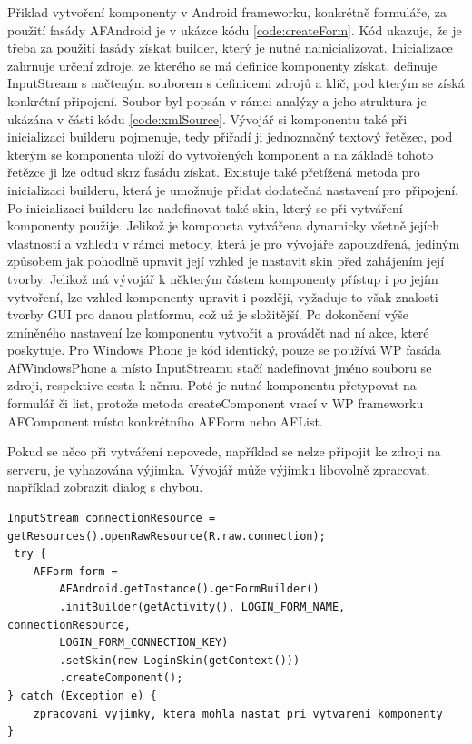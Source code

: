 Přiklad vytvoření komponenty v Android frameworku, konkrétně formuláře, za použití fasády AFAndroid je v ukázce kódu \ref{code:createForm}. Kód ukazuje, že je třeba za použití fasády získat builder, který je nutné nainicializovat. Inicializace zahrnuje určení zdroje, ze kterého se má definice komponenty získat, definuje InputStream s načteným souborem s definicemi zdrojů a klíč, pod kterým se získá konkrétní připojení. Soubor byl popsán v rámci analýzy a jeho struktura je ukázána v části kódu \ref{code:xmlSource}. Vývojář si komponentu také při inicializaci builderu pojmenuje, tedy přiřadí ji jednoznačný textový řetězec, pod kterým se komponenta uloží do vytvořených komponent a na základě tohoto řetězce ji lze odtud skrz fasádu získat. Existuje také přetížená metoda pro inicializaci builderu, která je umožnuje přidat dodatečná nastavení pro připojení. Po inicializaci builderu lze nadefinovat také skin, který se při vytváření komponenty použije. Jelikož je komponeta vytvářena dynamicky všetně jejích vlastností a vzhledu v rámci metody, která je pro vývojáře zapouzdřená, jediným způsobem jak pohodlně upravit její vzhled je nastavit skin před zahájením její tvorby. Jelikož má vývojář k některým částem komponenty přístup i po jejím vytvoření, lze vzhled komponenty upravit i později, vyžaduje to však znalosti tvorby GUI pro danou platformu, což už je složitější. Po dokončení výše zmíněného nastavení lze komponentu vytvořit a provádět nad ní akce, které poskytuje. Pro Windows Phone je kód identický, pouze se používá WP fasáda AfWindowsPhone a místo InputStreamu stačí nadefinovat jméno souboru se zdroji, respektive cesta k němu. Poté je nutné komponentu přetypovat na formulář či list, protože metoda createComponent vrací v WP frameworku AFComponent místo konkrétního AFForm nebo AFList.

Pokud se něco při vytváření nepovede,  například se nelze připojit ke zdroji na serveru, je vyhazována výjimka. Vývojář může výjimku libovolně zpracovat, například zobrazit dialog s chybou.

\begin{lstlisting}[float=h, caption=Ukázka tvorby formuláře,
label={code:createForm}, basicstyle=\footnotesize]
InputStream connectionResource = getResources().openRawResource(R.raw.connection);
 try {
	AFForm form = 
		AFAndroid.getInstance().getFormBuilder()
		.initBuilder(getActivity(), LOGIN_FORM_NAME, connectionResource, 
		LOGIN_FORM_CONNECTION_KEY)
		.setSkin(new LoginSkin(getContext()))
		.createComponent();
} catch (Exception e) {
	zpracovani vyjimky, ktera mohla nastat pri vytvareni komponenty
}
\end{lstlisting} 

